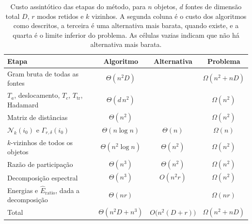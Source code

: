 \begin{table}[htbp]
\centering
\caption{Custo assintótico das etapas do método, para $n$ objetos, $d$ fontes de dimensão total $D$, $r$ modos retidos e $k$ vizinhos. A segunda coluna é o custo dos algoritmos como descritos, a terceira é uma alternativa mais barata, quando existe, e a quarta é o limite inferior do problema. As células vazias indicam que não há alternativa mais barata.}
\label{tab:custo}
\small
\begin{tabular}{l c c c}
\hline
Etapa & Algoritmo & Alternativa & Problema \\
\hline
Gram bruta de todas as fontes & $\Theta(n^2 D)$ & & $\Omega(n^2 + nD)$ \\
$T_a$, deslocamento, $T_c$, $T_{\mathrm{tr}}$, Hadamard & $\Theta(d\,n^2)$ & & $\Omega(n^2)$ \\
Matriz de distâncias & $\Theta(n^2)$ & & $\Omega(n^2)$ \\
$\mathcal{N}_k(i_0)$ e $\Gamma_{r,\delta}(i_0)$ & $\Theta(n \log n)$ & $\Theta(n)$ & $\Omega(n)$ \\
$k$-vizinhos de todos os objetos & $\Theta(n^2 \log n)$ & $\Theta(n^2)$ & $\Omega(n^2)$ \\
Razão de participação & $\Theta(n^3)$ & $\Theta(n^2)$ & $\Omega(n^2)$ \\
Decomposição espectral & $\Theta(n^3)$ & $O(n^2 r)$ & $\Omega(n^2)$ \\
Energias e $\widehat{E}_{\mathrm{ratio}}$, dada a decomposição & $\Theta(nr)$ & & $\Omega(nr)$ \\
\hline
Total & $\Theta(n^2 D + n^3)$ & $O\bigl(n^2(D + r)\bigr)$ & $\Omega(n^2 + nD)$ \\
\hline
\end{tabular}
\end{table}

